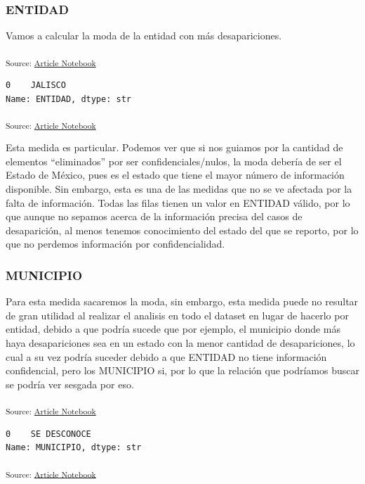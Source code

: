\documentclass[
]{agujournal2019}
\begin{document}
\subsubsection{ENTIDAD}\label{entidad}

Vamos a calcular la moda de la entidad con más desapariciones.

\textsubscript{Source:
\href{https://Rou-uu.github.io/pruebaQuarto/index.qmd.html}{Article
Notebook}}

\begin{verbatim}
0    JALISCO
Name: ENTIDAD, dtype: str
\end{verbatim}

\textsubscript{Source:
\href{https://Rou-uu.github.io/pruebaQuarto/index.qmd.html}{Article
Notebook}}

Esta medida es particular. Podemos ver que si nos guiamos por la
cantidad de elementos ``eliminados'' por ser confidenciales/nulos, la
moda debería de ser el Estado de México, pues es el estado que tiene el
mayor número de información disponible. Sin embargo, esta es una de las
medidas que no se ve afectada por la falta de información. Todas las
filas tienen un valor en ENTIDAD válido, por lo que aunque no sepamos
acerca de la información precisa del casos de desaparición, al menos
tenemos conocimiento del estado del que se reporto, por lo que no
perdemos información por confidencialidad.

\subsubsection{MUNICIPIO}\label{municipio}

Para esta medida sacaremos la moda, sin embargo, esta medida puede no
resultar de gran utilidad al realizar el analisis en todo el dataset en
lugar de hacerlo por entidad, debido a que podría sucede que por
ejemplo, el municipio donde más haya desapariciones sea en un estado con
la menor cantidad de desapariciones, lo cual a su vez podría suceder
debido a que ENTIDAD no tiene información confidencial, pero los
MUNICIPIO si, por lo que la relación que podríamos buscar se podría ver
sesgada por eso.

\textsubscript{Source:
\href{https://Rou-uu.github.io/pruebaQuarto/index.qmd.html}{Article
Notebook}}

\begin{verbatim}
0    SE DESCONOCE
Name: MUNICIPIO, dtype: str
\end{verbatim}

\textsubscript{Source:
\href{https://Rou-uu.github.io/pruebaQuarto/index.qmd.html}{Article
Notebook}}
\end{document}
